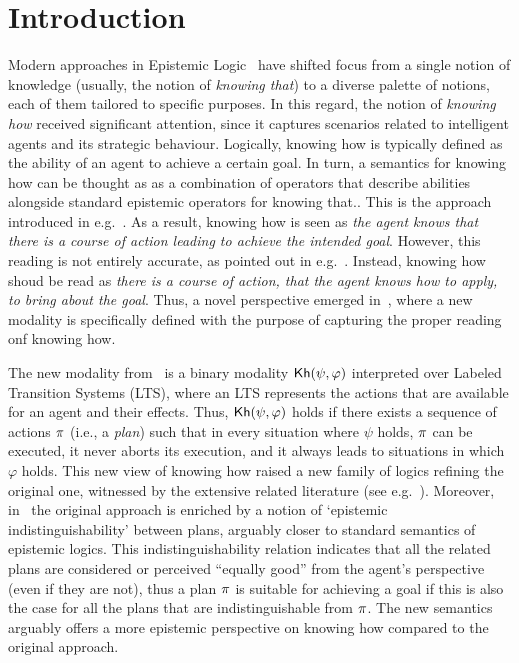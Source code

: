 \section{Introduction}
\label{sec:intro}

Modern approaches in Epistemic Logic~\cite{vonWright:1951,Hintikka:1962} have shifted focus from a single notion of knowledge (usually, the notion of \emph{knowing that}) to a diverse palette of notions, each of them tailored to specific purposes. In this regard, the notion of \emph{knowing how} received significant attention, since it captures scenarios related to intelligent agents and its strategic behaviour. Logically, knowing how is typically defined as the ability of an agent to achieve a certain goal.
In turn, a semantics for knowing how can be thought as as a combination of operators that describe abilities alongside standard epistemic operators for knowing that.. This is the approach introduced in e.g.~\cite{Mccarthy69,Moore85,Les00,Hoek00,HerzigT06}. As a result, knowing how is seen as \emph{the agent knows that there is a course of action leading to achieve the intended goal}. However, this reading is not entirely accurate, as pointed out in e.g.~\cite{JamrogaA07,Herzig15}. Instead, knowing how shoud be read as \emph{there is a course of action, that the agent knows how to apply, to bring about the goal}. Thus, a novel perspective emerged in~\cite{Wang15lori,Wang16,Wang2016}, where a new modality is specifically defined with the purpose of capturing the proper reading onf knowing how. 


The new modality from~\cite{Wang15lori,Wang16,Wang2016} is a binary modality ${\mathsf{Kh}}(\psi,\varphi)$ interpreted over Labeled Transition Systems (LTS), where an LTS represents the  actions that are available for an agent and their effects. Thus, ${\mathsf{Kh}}(\psi,\varphi)$ holds if there exists a sequence of actions $\pi$ (i.e., a \emph{plan}) such that in every situation where $\psi$ holds, $\pi$ can be executed, it never aborts its execution, and it always leads to situations in which $\varphi$ holds. This new view of knowing how raised a new family of logics refining the original one, witnessed by the extensive related literature (see e.g.~\cite{LiWang17,Li17,Li17bis,FervariHLW17,LiW21,NaumovT17,NaumovT18,NaumovT19,Naumov2018a}). Moreover, in~\cite{AFSVQ21,AFSVQ23} the original approach is enriched by a notion of `epistemic indistinguishability' between plans, arguably closer to standard semantics of epistemic logics. This indistinguishability relation indicates that all the related plans are considered or perceived ``equally good''
from the agent's perspective (even if they are not), thus a plan $\pi$ is suitable for achieving a goal if this is also the case for all the plans that are indistinguishable from $\pi$. The new semantics arguably offers a more epistemic perspective on knowing how compared to the original approach.

